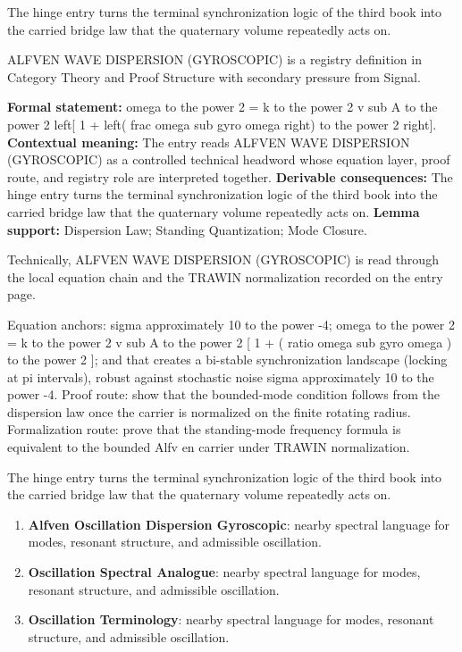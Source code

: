 The hinge entry turns the terminal synchronization logic of the third book into the carried bridge law that the quaternary volume repeatedly acts on.
\clearpage


\begingroup\small
{}
ALFVEN WAVE DISPERSION (GYROSCOPIC) is a registry definition in Category Theory and Proof Structure with secondary pressure from Signal.

\begingroup\footnotesize\setlength{\emergencystretch}{3em}\sloppy
\textbf{Formal statement:} omega to the power 2 = k to the power 2 v sub A to the power 2 left[ 1 + left( frac omega sub gyro omega right) to the power 2 right]. \textbf{Contextual meaning:} The entry reads ALFVEN WAVE DISPERSION (GYROSCOPIC) as a controlled technical headword whose equation layer, proof route, and registry role are interpreted together. \textbf{Derivable consequences:} The hinge entry turns the terminal synchronization logic of the third book into the carried bridge law that the quaternary volume repeatedly acts on. \textbf{Lemma support:} Dispersion Law; Standing Quantization; Mode Closure.\par
\endgroup

Technically, ALFVEN WAVE DISPERSION (GYROSCOPIC) is read through the local equation chain and the TRAWIN normalization recorded on the entry page.

Equation anchors: sigma approximately 10 to the power -4; omega to the power 2 = k to the power 2 v sub A to the power 2 [ 1 + ( ratio omega sub gyro omega ) to the power 2 ]; and that creates a bi-stable synchronization landscape (locking at pi intervals), robust against stochastic noise sigma approximately 10 to the power -4. Proof route: show that the bounded-mode condition follows from the dispersion law once the carrier is normalized on the finite rotating radius. Formalization route: prove that the standing-mode frequency formula is equivalent to the bounded Alfv en carrier under TRAWIN normalization.

The hinge entry turns the terminal synchronization logic of the third book into the carried bridge law that the quaternary volume repeatedly acts on.
\endgroup

\begin{enumerate}[leftmargin=1.6em,itemsep=6pt,topsep=4pt]
\item \textbf{Alfven Oscillation Dispersion Gyroscopic}: nearby spectral language for modes, resonant structure, and admissible oscillation.
\item \textbf{Oscillation Spectral Analogue}: nearby spectral language for modes, resonant structure, and admissible oscillation.
\item \textbf{Oscillation Terminology}: nearby spectral language for modes, resonant structure, and admissible oscillation.
\end{enumerate}

